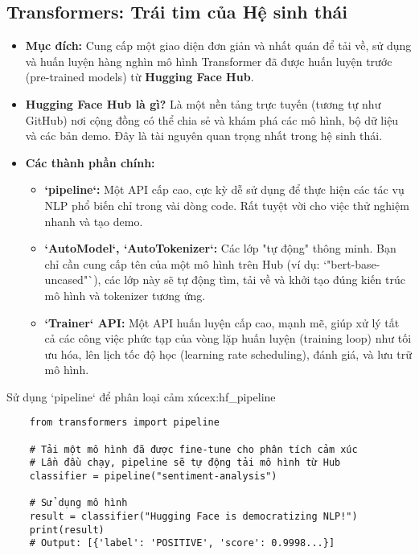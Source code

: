 \subsection{Transformers: Trái tim của Hệ sinh thái}
\label{ssec:hf_transformers}
\begin{itemize}
    \item \textbf{Mục đích:} Cung cấp một giao diện đơn giản và nhất quán để tải về, sử dụng và huấn luyện hàng nghìn mô hình Transformer đã được huấn luyện trước (pre-trained models) từ \textbf{Hugging Face Hub}.
    \item \textbf{Hugging Face Hub là gì?} Là một nền tảng trực tuyến (tương tự như GitHub) nơi cộng đồng có thể chia sẻ và khám phá các mô hình, bộ dữ liệu và các bản demo. Đây là tài nguyên quan trọng nhất trong hệ sinh thái.
    \item \textbf{Các thành phần chính:}
        \begin{itemize}
            \item \textbf{`pipeline`:} Một API cấp cao, cực kỳ dễ sử dụng để thực hiện các tác vụ NLP phổ biến chỉ trong vài dòng code. Rất tuyệt vời cho việc thử nghiệm nhanh và tạo demo.
            \item \textbf{`AutoModel`, `AutoTokenizer`:} Các lớp "tự động" thông minh. Bạn chỉ cần cung cấp tên của một mô hình trên Hub (ví dụ: `"bert-base-uncased"`), các lớp này sẽ tự động tìm, tải về và khởi tạo đúng kiến trúc mô hình và tokenizer tương ứng.
            \item \textbf{`Trainer` API:} Một API huấn luyện cấp cao, mạnh mẽ, giúp xử lý tất cả các công việc phức tạp của vòng lặp huấn luyện (training loop) như tối ưu hóa, lên lịch tốc độ học (learning rate scheduling), đánh giá, và lưu trữ mô hình.
        \end{itemize}
\end{itemize}

\begin{example}{Sử dụng `pipeline` để phân loại cảm xúc}{ex:hf_pipeline}
    \begin{verbatim}
    from transformers import pipeline

    # Tải một mô hình đã được fine-tune cho phân tích cảm xúc
    # Lần đầu chạy, pipeline sẽ tự động tải mô hình từ Hub
    classifier = pipeline("sentiment-analysis")

    # Sử dụng mô hình
    result = classifier("Hugging Face is democratizing NLP!")
    print(result)
    # Output: [{'label': 'POSITIVE', 'score': 0.9998...}]
    \end{verbatim}
\end{example}


